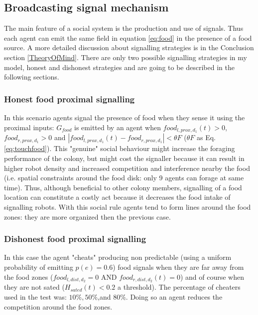 \subsection{Broadcasting signal mechanism \label{SocialSystem:Broadcast}}

The main feature of a social system is the production and use of signals.
Thus each agent can emit the same field in equation \ref{eq:food} in the presence of a food source.
A more detailed discussion about signalling strategies is in the Conclusion section \ref{TheoryOfMind}.
There are only two possible signalling strategies in my model, honest and dishonest
strategies and are going to be described in the following sections.

\subsubsection{Honest food proximal signalling}
In this scenario agents signal the presence of food when they sense it using
the proximal inputs: $G_{food}$ is emitted by an agent when $food_{l,prox,d_{1}}(t)>0$, $food_{r,prox,d_{1}}>0$
and $|food_{l,prox,d_{1}}(t)-food_{r,prox,d_{1}}|<\theta F$ ($\theta F$ as Eq.\ref{eq:touchfood}).
This "genuine" social behaviour might increase the foraging performance of the colony,
but might cost the signaller because it can result in higher robot density and increased
competition and interference nearby the food (i.e. spatial constraints around the food disk:
only 9 agents can forage at same time). Thus, although beneficial to other colony members,
signalling of a food location can constitute a costly act \citep{AnimalSignals} because it
decreases the food intake of signalling robots. With this social rule agents tend to form
lines around the food zones: they are more organized then the previous case.

\subsubsection{Dishonest food proximal signalling}
In this case the agent "cheats" producing non predictable (using a uniform probability
of emitting $p(e)=0.6$) food signals when they are far away from the food zones
($food_{l,dist,d_{2}}=0$ AND $food_{r,dist,d_{2}}(t)=0$) and of course when they
are not sated ($H_{sated}(t)< 0.2$ a threshold). The percentage of cheaters used in the
test was: $10\%,50\%$,and $80\%$. Doing so an agent reduces the competition around the food zones.


